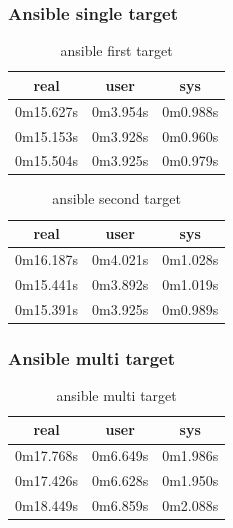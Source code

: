 \documentclass[10pt,]{report}
\begin{document}
\begin{adjustwidth}{20pt}{}
	\subsubsection{Ansible single target}
	\begin{table}[H]
		\caption{ansible first target}
		\begin{center}
			\begin{tabular}[c]{|c|c|c|}
				\hline
				\multicolumn{1}{|c|}{\textbf{real}} &
				\multicolumn{1}{c|}{\textbf{user}}  &
				\multicolumn{1}{c|}{\textbf{sys}}                         \\
				\hline
				0m15.627s                           & 0m3.954s & 0m0.988s \\
				\hline
				0m15.153s                           & 0m3.928s & 0m0.960s \\
				\hline
				0m15.504s                           & 0m3.925s & 0m0.979s \\
				\hline
			\end{tabular}
		\end{center}
	\end{table}
	\vspace{-5mm}
	\begin{table}[H]
		\caption{ansible second target}
		\begin{center}
			\begin{tabular}[c]{|c|c|c|}
				\hline
				\multicolumn{1}{|c|}{\textbf{real}} &
				\multicolumn{1}{c|}{\textbf{user}}  &
				\multicolumn{1}{c|}{\textbf{sys}}                         \\
				\hline
				0m16.187s                           & 0m4.021s & 0m1.028s \\
				\hline
				0m15.441s                           & 0m3.892s & 0m1.019s \\
				\hline
				0m15.391s                           & 0m3.925s & 0m0.989s \\
				\hline
			\end{tabular}
		\end{center}
	\end{table}
	\subsubsection{Ansible multi target}
	\begin{table}[H]
		\caption{ansible multi target}
		\begin{center}
			\begin{tabular}[c]{|c|c|c|}
				\hline
				\multicolumn{1}{|c|}{\textbf{real}} &
				\multicolumn{1}{c|}{\textbf{user}}  &
				\multicolumn{1}{c|}{\textbf{sys}}                         \\
				\hline
				0m17.768s                           & 0m6.649s & 0m1.986s \\
				\hline
				0m17.426s                           & 0m6.628s & 0m1.950s \\
				\hline
				0m18.449s                           & 0m6.859s & 0m2.088s \\
				\hline
			\end{tabular}
		\end{center}
	\end{table}

\end{adjustwidth}
\end{document}
